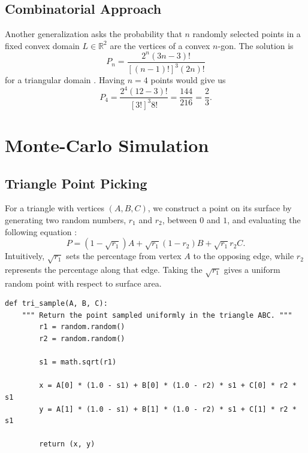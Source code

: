 \documentclass{article}
\begin{document}
\subsection{Combinatorial Approach}

Another generalization asks the probability that $n$ randomly selected points in a fixed convex domain $L\in\mathbb{R}^{2}$ are the vertices of a convex $n$-gon.
The solution is
\begin{equation}
    P_{n} = \frac{2^{n}(3n - 3)!}{[(n - 1)!]^{3}(2n)!}
\end{equation}
for a triangular domain \cite{valtr}.
Having $n = 4$ points would give us
\begin{equation}
    P_{4} = \frac{2^{4}(12 - 3)!}{[3!]^{3}8!} = \frac{144}{216} = \frac{2}{3}.
\end{equation}

\newpage 

\section{Monte-Carlo Simulation}

\subsection{Triangle Point Picking}
For a triangle with vertices $(A, B, C)$, we construct a point on its surface by generating two random numbers, $r_1$ and $r_2$, between $0$ and $1$, and evaluating the following equation \cite{shape}:
\begin{equation}
    P = (1 - \sqrt{r_{1}})A + \sqrt{r_{1}}(1 - r_{2})B + \sqrt{r_{1}}r_{2}C.
\end{equation}
Intuitively, $\sqrt{r_{1}}$ sets the percentage from vertex $A$ to the opposing edge, while $r_{2}$ represents the percentage along that edge. 
Taking the $\sqrt{r_{1}}$ gives a uniform random point with respect to surface area.

\begin{lstlisting}[caption=Sampling a point inside a triangle.]
    def tri_sample(A, B, C):
    """ Return the point sampled uniformly in the triangle ABC. """
        r1 = random.random()
        r2 = random.random()
    
        s1 = math.sqrt(r1)
    
        x = A[0] * (1.0 - s1) + B[0] * (1.0 - r2) * s1 + C[0] * r2 * s1
        y = A[1] * (1.0 - s1) + B[1] * (1.0 - r2) * s1 + C[1] * r2 * s1
    
        return (x, y)    
\end{lstlisting}
\end{document}
